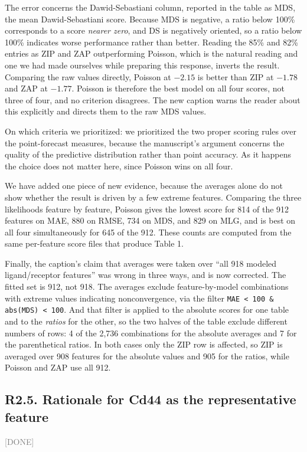 \documentclass[11pt]{article}
\newcommand{\status}[1]{\textcolor{gray}{\small\textsf{[#1]}}}
\begin{document}
The error concerns the Dawid-Sebastiani column, reported in the table as MDS, the mean
Dawid-Sebastiani score. Because MDS is negative, a ratio below
100\% corresponds to a score \emph{nearer zero}, and DS is negatively oriented, so a ratio
below 100\% indicates worse performance rather than better. Reading the 85\% and 82\%
entries as ZIP and ZAP outperforming Poisson, which is the natural reading and one we had
made ourselves while preparing this response, inverts the result. Comparing the raw values
directly, Poisson at $-2.15$ is better than ZIP at $-1.78$ and ZAP at $-1.77$. Poisson is
therefore the best model on all four scores, not three of four, and no criterion disagrees.
The new caption warns the reader about this explicitly and directs them to the raw MDS
values.

On which criteria we prioritized: we prioritized the two proper scoring rules over the
point-forecast measures, because the manuscript's argument concerns the quality of the
predictive distribution rather than point accuracy. As it happens the choice does not
matter here, since Poisson wins on all four.

We have added one piece of new evidence, because the averages alone do not show whether the
result is driven by a few extreme features. Comparing the three likelihoods feature by
feature, Poisson gives the lowest score for 814 of the 912 features on MAE, 880 on RMSE, 734
on MDS, and 829 on MLG, and is best on all four simultaneously for 645 of the 912. These
counts are computed from the same per-feature score files that produce Table 1.

Finally, the caption's claim that averages were taken over ``all 918 modeled
ligand/receptor features'' was wrong in three ways, and is now corrected. The fitted set is
912, not 918. The averages exclude feature-by-model combinations with extreme values
indicating nonconvergence, via the filter \texttt{MAE < 100 \& abs(MDS) < 100}. And that
filter is applied to the absolute scores for one table and to the \emph{ratios} for the
other, so the two halves of the table exclude different numbers of rows: 4 of the 2,736
combinations for the absolute averages and 7 for the parenthetical ratios. In both cases
only the ZIP row is affected, so ZIP is averaged over 908 features for the absolute values
and 905 for the ratios, while Poisson and ZAP use all 912.

\subsection{R2.5. Rationale for Cd44 as the representative feature} \status{DONE}
\end{document}
